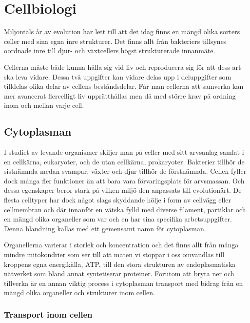 \chapter{Cellbiologi}

Miljontals år av evolution har lett till att det idag finns en mängd olika sorters celler med sina egna inre strukturer. Det finns allt från bakteriers tillsynes oordnade inre till djur- och växtcellers högst strukturerade innanmäte. 

Cellerna måste både kunna hålla sig vid liv och reproducera sig för att dess art ska leva vidare. Dessa två uppgifter kan vidare delas upp i deluppgifter som tilldelas olika delar av cellens beståndsdelar. Får man cellerna att samverka kan mer avancerat flercelligt liv upprätthållas men då med större krav på ordning inom och mellan varje cell.


\section{Cytoplasman}
I studiet av levande organismer skiljer \cite{Cooper_TheCell2000} man på celler med sitt arvsanlag samlat i en cellkärna, eukaryoter, och de utan cellkärna, prokaryoter. Bakterier tillhör de sistnämnda medan svampar, växter och djur tillhör de förstnämnda. Cellen fyller dock många fler funktioner än att bara vara förvaringsplats för arvsmassan. Och dessa egenskaper beror stark på vilken miljö den anpassats till evolutionärt. De flesta celltyper har dock något slags skyddande hölje i form av cellvägg eller cellmembran och där innanför en vätska fylld med diverse filament, partiklar och en mängd olika organeller som var och en har sina specifika arbetsuppgifter. Denna blandning kallas med ett gemensamt namn för cytoplasman. 

Organellerna varierar i storlek och koncentration och det finns allt från många mindre mitokondrier som ser till att maten vi stoppar i oss omvandlas till kroppens egna energikälla, ATP, till den stora strukturen av endoplasmatiska nätverket som bland annat syntetiserar proteiner. Förutom att bryta ner och tillverka är en annan viktig process i cytoplasman transport med bidrag från en mängd olika organeller och strukturer inom cellen.


\subsection{Transport inom cellen}

